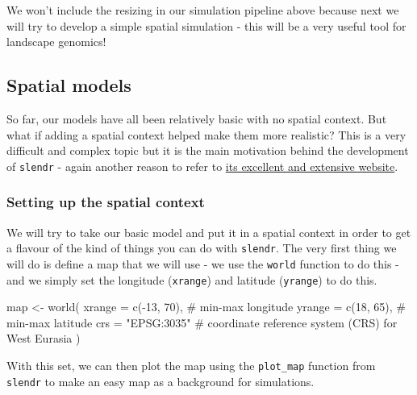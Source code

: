 \documentclass[
  letterpaper,
  DIV=11,
  numbers=noendperiod]{scrartcl}
\newenvironment{Shaded}{\begin{snugshade}}{\end{snugshade}}
\newcommand{\AttributeTok}[1]{\textcolor[rgb]{0.40,0.45,0.13}{#1}}
\newcommand{\CommentTok}[1]{\textcolor[rgb]{0.37,0.37,0.37}{#1}}
\newcommand{\DecValTok}[1]{\textcolor[rgb]{0.68,0.00,0.00}{#1}}
\newcommand{\FunctionTok}[1]{\textcolor[rgb]{0.28,0.35,0.67}{#1}}
\newcommand{\NormalTok}[1]{\textcolor[rgb]{0.00,0.23,0.31}{#1}}
\newcommand{\OtherTok}[1]{\textcolor[rgb]{0.00,0.23,0.31}{#1}}
\newcommand{\SpecialCharTok}[1]{\textcolor[rgb]{0.37,0.37,0.37}{#1}}
\newcommand{\StringTok}[1]{\textcolor[rgb]{0.13,0.47,0.30}{#1}}
\begin{document}
We won't include the resizing in our simulation pipeline above because
next we will try to develop a simple spatial simulation - this will be a
very useful tool for landscape genomics!

\hypertarget{spatial-models}{%
\subsection{Spatial models}\label{spatial-models}}

So far, our models have all been relatively basic with no spatial
context. But what if adding a spatial context helped make them more
realistic? This is a very difficult and complex topic but it is the main
motivation behind the development of \texttt{slendr} - again another
reason to refer to \href{https://www.slendr.net/}{its excellent and
extensive website}.

\hypertarget{setting-up-the-spatial-context}{%
\subsubsection{Setting up the spatial
context}\label{setting-up-the-spatial-context}}

We will try to take our basic model and put it in a spatial context in
order to get a flavour of the kind of things you can do with
\texttt{slendr}. The very first thing we will do is define a map that we
will use - we use the \texttt{world} function to do this - and we simply
set the longitude (\texttt{xrange}) and latitude (\texttt{yrange}) to do
this.

\begin{Shaded}
\begin{Highlighting}[]
\NormalTok{map }\OtherTok{\textless{}{-}} \FunctionTok{world}\NormalTok{(}
  \AttributeTok{xrange =} \FunctionTok{c}\NormalTok{(}\SpecialCharTok{{-}}\DecValTok{13}\NormalTok{, }\DecValTok{70}\NormalTok{), }\CommentTok{\# min{-}max longitude}
  \AttributeTok{yrange =} \FunctionTok{c}\NormalTok{(}\DecValTok{18}\NormalTok{, }\DecValTok{65}\NormalTok{),  }\CommentTok{\# min{-}max latitude}
  \AttributeTok{crs =} \StringTok{"EPSG:3035"}    \CommentTok{\# coordinate reference system (CRS) for West Eurasia}
\NormalTok{)}
\end{Highlighting}
\end{Shaded}

With this set, we can then plot the map using the \texttt{plot\_map}
function from \texttt{slendr} to make an easy map as a background for
simulations.
\end{document}
